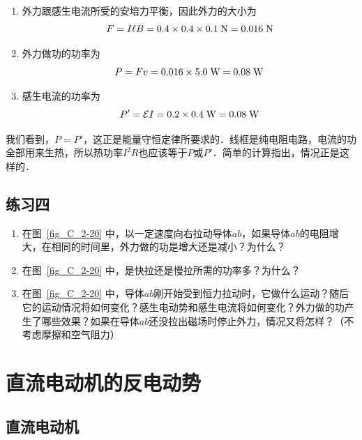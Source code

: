 \begin{solution}
    \begin{enumerate}
        \item 外力跟感生电流所受的安培力平衡，因此外力的大小为
        \[F=I\ell B=0.4\times0.4\times0.1 \;\text{N}
        =0.016 \;\text{N} \]
        \item 外力做功的功率为
        \[P=Fv=0.016\times5.0 \;\text{W} =0.08 \;\text{W} \]
        \item 感生电流的功率为
        \[P'=\mathcal{E}I=0.2\times0.4 \;\text{W} =0.08 \;\text{W} \]
    \end{enumerate}
\end{solution}

我们看到，$P=P'$，这正是能量守恒定律所要求的．线框是纯电阻电路，电流的功全部用来生热，所以热功率$I^2R$也应该等于$P$或$P'$．简单的计算指出，情况正是这样的．

\subsection*{练习四}
\begin{enumerate}
    \item 在图~\ref{fig_C_2-20} 中，以一定速度向右拉动导体$ab$，如果导体$ab$的电阻增大，在相同的时间里，外力做的功是增大还是减小？为什么？
    \item 在图~\ref{fig_C_2-20} 中，是快拉还是慢拉所需的功率多？为什么？
    \item 在图~\ref{fig_C_2-20} 中，导体$ab$刚开始受到恒力拉动时，它做什么运动？随后它的运动情况将如何变化？感生电动势和感生电流将如何变化？外力做的功产生了哪些效果？如果在导体$ab$还没拉出磁场时停止外力，情况又将怎样？（不考虑摩擦和空气阻力）
\end{enumerate}

\section{直流电动机的反电动势}
\subsection{直流电动机}

